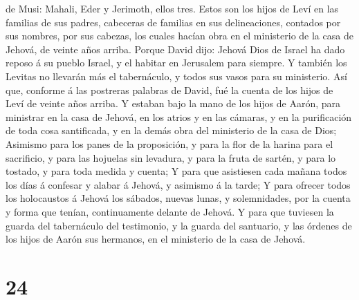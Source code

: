 de Musi: Mahali, Eder y Jerimoth, ellos tres.  Estos son
los hijos de Leví en las familias de sus padres, cabeceras de familias
en sus delineaciones, contados por sus nombres, por sus cabezas, los
cuales hacían obra en el ministerio de la casa de Jehová, de veinte años
arriba.  Porque David dijo: Jehová Dios de Israel ha dado
reposo á su pueblo Israel, y el habitar en Jerusalem para siempre.
 Y también los Levitas no llevarán más el tabernáculo, y
todos sus vasos para su ministerio.  Así que, conforme á
las postreras palabras de David, fué la cuenta de los hijos de Leví de
veinte años arriba.  Y estaban bajo la mano de los hijos
de Aarón, para ministrar en la casa de Jehová, en los atrios y en las
cámaras, y en la purificación de toda cosa santificada, y en la demás
obra del ministerio de la casa de Dios;  Asimismo para
los panes de la proposición, y para la flor de la harina para el
sacrificio, y para las hojuelas sin levadura, y para la fruta de sartén,
y para lo tostado, y para toda medida y cuenta;  Y para
que asistiesen cada mañana todos los días á confesar y alabar á Jehová,
y asimismo á la tarde;  Y para ofrecer todos los
holocaustos á Jehová los sábados, nuevas lunas, y solemnidades, por la
cuenta y forma que tenían, continuamente delante de Jehová.
 Y para que tuviesen la guarda del tabernáculo del
testimonio, y la guarda del santuario, y las órdenes de los hijos de
Aarón sus hermanos, en el ministerio de la casa de Jehová.

\hypertarget{section-23}{%
\section{24}\label{section-23}}

